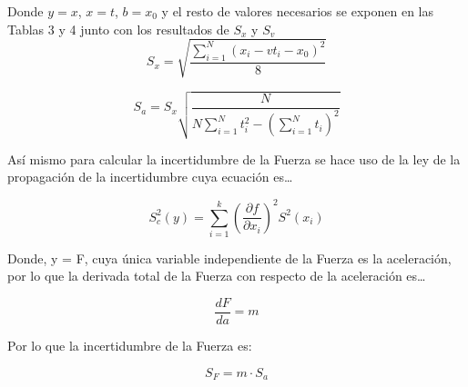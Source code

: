 \documentclass[12pt,a4paper]{article}
\begin{document}
Donde $y = x$, $x = t$, $b = x_0$ y el resto de valores necesarios se exponen en las Tablas 3 y 4 junto con los resultados de $S_x$ y $S_v$\\

\[S_x = \sqrt{\frac{\sum_{i=1}^{N}(x_i - vt_i - x_0)^2}{8}}\] 

\[S_a = S_x \sqrt{\frac{N}{N\sum_{i=1}^{N} t_i^2 - \left(\sum_{i=1}^{N}  t_i\right)^2}}\]

Así mismo para calcular la incertidumbre de la Fuerza se hace uso de la ley de la propagación de la incertidumbre cuya ecuación es…

\[S_c^2(y) = \sum^k_{i=1} \left(\frac{\partial f}{\partial x_i}\right)^2 S^2(x_i)\]  

Donde, y = F, cuya única variable independiente de la Fuerza es la aceleración, por lo que la derivada total de la Fuerza con respecto de la aceleración es…

\[\frac{dF}{da} = m\]

Por lo que la incertidumbre de la Fuerza es:

\[S_F = m \cdot S_a\]

\clearpage
\end{document}
